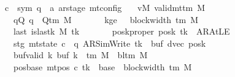 \begin{isabellebody}
\ \ \ \ \ c{\isacharprime}{\kern0pt}\ {\isacharcolon}{\kern0pt}{\isacharcolon}{\kern0pt}\ {\isachardoublequoteopen}{\isacharparenleft}{\kern0pt}sym{}{\isacharcomma}{\kern0pt}\ {\isacharprime}{\kern0pt}q\ {\isasymtimes}\ {\isacharprime}{\kern0pt}a\ ar{\isacharunderscore}{\kern0pt}stage{\isacharparenright}{\kern0pt}\ mt{\isacharunderscore}{\kern0pt}config{\isachardoublequoteclose}\isanewline
\ \ \ vM{\isacharcolon}{\kern0pt}\ {\isachardoublequoteopen}valid{\isacharunderscore}{\kern0pt}mttm\ M{\isachardoublequoteclose}\isanewline
\ \ \ \ \ \ \ qQ{\isacharcolon}{\kern0pt}\ {\isachardoublequoteopen}q\ {\isasymin}\ Q{\isacharunderscore}{\kern0pt}tm\ M{\isachardoublequoteclose}\isanewline
\ \ \ \ \ \ \ kge{}{\isacharcolon}{\kern0pt}\ {\isachardoublequoteopen}{}\ {\isasymle}\ block{\isacharunderscore}{\kern0pt}width\ {\isacharparenleft}{\kern0pt}{\isasymGamma}{\isacharunderscore}{\kern0pt}tm\ M{\isacharparenright}{\kern0pt}{\isachardoublequoteclose}\isanewline
\ \ \ \ \ \ \ last{\isacharcolon}{\kern0pt}\ {\isachardoublequoteopen}is{\isacharunderscore}{\kern0pt}last{\isacharunderscore}{\kern0pt}k\ M\ tk{\isachardoublequoteclose}\isanewline
\ \ \ \ \ \ \ poskproper{\isacharcolon}{\kern0pt}\ {\isachardoublequoteopen}posk\ tk\ {\isasymnoteq}\ AR{\isacharunderscore}{\kern0pt}AtLE{\isachardoublequoteclose}\isanewline
\ \ \ \ \ \ \ stg{\isacharcolon}{\kern0pt}\ {\isachardoublequoteopen}mt{\isacharunderscore}{\kern0pt}state\ c{\isacharprime}{\kern0pt}\ {\isacharequal}{\kern0pt}\ {\isacharparenleft}{\kern0pt}q{\isacharcomma}{\kern0pt}\ AR{\isacharunderscore}{\kern0pt}SimWrite{\isacharcomma}{\kern0pt}\ tk{\isacharcomma}{\kern0pt}\ {}{\isacharcomma}{\kern0pt}\ buf{\isacharcomma}{\kern0pt}\ dvec{\isacharcomma}{\kern0pt}\ posk{\isacharparenright}{\kern0pt}{\isachardoublequoteclose}\isanewline
\ \ \ \ \ \ \ buf{\isacharunderscore}{\kern0pt}valid{\isacharcolon}{\kern0pt}\ {\isachardoublequoteopen}{\isasymforall}k{\isachardot}{\kern0pt}\ buf\ k\ {\isasymin}\ {\isasymGamma}{\isacharunderscore}{\kern0pt}tm\ M\ {\isasymunion}\ {\isacharbraceleft}{\kern0pt}bl{\isacharunderscore}{\kern0pt}tm\ M{\isacharbraceright}{\kern0pt}{\isachardoublequoteclose}\isanewline
\ \ \ \ \ \ \ pos{\isacharunderscore}{\kern0pt}base{\isacharcolon}{\kern0pt}\ {\isachardoublequoteopen}mt{\isacharunderscore}{\kern0pt}pos\ c{\isacharprime}{\kern0pt}\ tk\ {\isacharequal}{\kern0pt}\ base\ {\isacharplus}{\kern0pt}\ block{\isacharunderscore}{\kern0pt}width\ {\isacharparenleft}{\kern0pt}{\isasymGamma}{\isacharunderscore}{\kern0pt}tm\ M{\isacharparenright}{\kern0pt}{\isachardoublequoteclose}\isanewline

\end{isabellebody}
